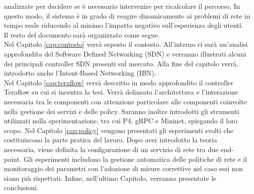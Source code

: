 analizzate per decidere se è necessario intervenire per ricalcolare il percorso.
In questo modo, il sistema è in grado di reagire dinamicamente ai problemi di rete in tempo reale riducendo al minimo l'impatto negativo sull'esperienza degli utenti.
\\Il resto del documento sarà organizzato come segue.
\\Nel Capitolo \ref{cap:contesto} verrà esposto il contesto. All'interno ci sarà un'analisi approfondita del Software Defined Networking (SDN)
e verranno illustrati alcuni dei principali controller SDN presenti sul mercato. Alla fine del capitolo verrà, introdotto anche l'Intent-Based Networking (IBN).
\\Nel Capitolo \ref{cap:teraflow} verrà descritto in modo approfondito il controller Teraflow su cui si incentra la tesi.
Verrà delineata l'architettura e l'interazione necessaria tra le componenti con attenzione particolare alle componenti coinvolte nella gestione dei servizi e delle policy.
Saranno inoltre introdotti gli strumenti utilizzati nella sperimentazione, tra cui P4, gRPC e Mininet, spiegando il loro scopo.
Nel Capitolo \ref{cap:policy} vengono presentati gli esperimenti svolti che costituiscono la parte pratica del lavoro.
Dopo aver introdotto la teoria necessaria, viene definita la configurazione di un servizio di rete tra due end-point. Gli esperimenti includono la gestione
automatica delle politiche di rete e il monitoraggio dei parametri con l'adozione di misure correttive nel caso essi non siano più rispettati.
Infine, nell'ultimo Capitolo, verranno presentate le conclusioni.
